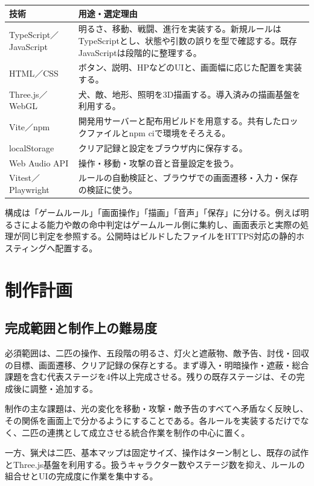 \documentclass[a4paper,11pt,dvipdfmx]{jsarticle}
\begin{document}
{\small
\begin{longtable}{@{}P{0.23\dimexpr{}\tabcolsep\relax}P{0.77\dimexpr{}\tabcolsep\relax}@{}}
\toprule
\textbf{技術} & \textbf{用途・選定理由} \\
\midrule
\endhead
TypeScript／JavaScript & 明るさ、移動、戦闘、進行を実装する。新規ルールはTypeScriptとし、状態や引数の誤りを型で確認する。既存JavaScriptは段階的に整理する。 \\
HTML／CSS & ボタン、説明、HPなどのUIと、画面幅に応じた配置を実装する。 \\
Three.js／WebGL & 犬、敵、地形、照明を3D描画する。導入済みの描画基盤を利用する。 \\
Vite／npm & 開発用サーバーと配布用ビルドを用意する。共有したロックファイルとnpm ciで環境をそろえる。 \\
localStorage & クリア記録と設定をブラウザ内に保存する。 \\
Web Audio API & 操作・移動・攻撃の音と音量設定を扱う。 \\
Vitest／Playwright & ルールの自動検証と、ブラウザでの画面遷移・入力・保存の検証に使う。 \\
\bottomrule
\end{longtable}
}

構成は「ゲームルール」「画面操作」「描画」「音声」「保存」に分ける。例えば明るさによる能力や敵の命中判定はゲームルール側に集約し、画面表示と実際の処理が同じ判定を参照する。公開時はビルドしたファイルをHTTPS対応の静的ホスティングへ配置する。

\section{制作計画}

\subsection{完成範囲と制作上の難易度}

必須範囲は、二匹の操作、五段階の明るさ、灯火と遮蔽物、敵予告、討伐・回収の目標、画面遷移、クリア記録の保存とする。まず導入・明暗操作・遮蔽・総合課題を含む代表ステージを4件以上完成させる。残りの既存ステージは、その完成後に調整・追加する。

制作の主な課題は、光の変化を移動・攻撃・敵予告のすべてへ矛盾なく反映し、その関係を画面上で分かるようにすることである。各ルールを実装するだけでなく、二匹の連携として成立させる統合作業を制作の中心に置く。

一方、猟犬は二匹、基本マップは固定サイズ、操作はターン制とし、既存の試作とThree.js基盤を利用する。扱うキャラクター数やステージ数を抑え、ルールの組合せとUIの完成度に作業を集中する。
\end{document}

